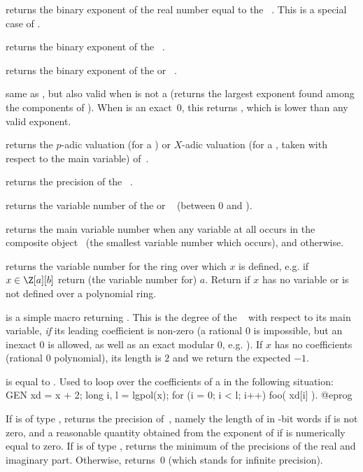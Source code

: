  returns the binary exponent of the real number equal
to the ~. This is a special case of .

 returns the binary exponent of the
~.

 returns the binary exponent of the 
or ~.

 same as , but also valid when 
is not a  (returns the largest exponent found among the components
of ). When  is an exact~0, this returns
\hbox{}, which is lower than any valid exponent.

 returns the $p$-adic valuation (for
a ) or $X$-adic valuation (for a , taken with respect to
the main variable) of~.

 returns the precision of the ~.

 returns the variable number of the
 or ~ (between 0 and ).

 returns the main variable number when any variable
at all occurs in the composite object~ (the smallest variable number
which occurs), and  otherwise.

 returns the variable number for the ring over which
$x$ is defined, e.g. if $x\in \Z[a][b]$ return (the variable number for)
$a$. Return  if $x$ has no variable or is not defined over a
polynomial ring.

 is a simple macro returning .
This is the degree of the ~ with respect to its main
variable, \emph{if} its leading coefficient is non-zero (a rational $0$ is
impossible, but an inexact $0$ is allowed, as well as an exact modular $0$,
e.g. ). If $x$ has no coefficients (rational $0$ polynomial),
its length is $2$ and we return the expected $-1$.

 is equal to . Used to loop over
the coefficients of a  in the following situation:
\bprog
    GEN xd = x + 2;
    long i, l = lgpol(x);
    for (i = 0; i < l; i++) foo( xd[i] ).
@eprog

 If  is of type , returns the
precision of~, namely the length of  in \B-bit words if 
is not zero, and a reasonable quantity obtained from the exponent of 
if  is numerically equal to zero. If  is of type
, returns the minimum of the precisions of the real and
imaginary part. Otherwise, returns~0 (which stands for infinite precision).


